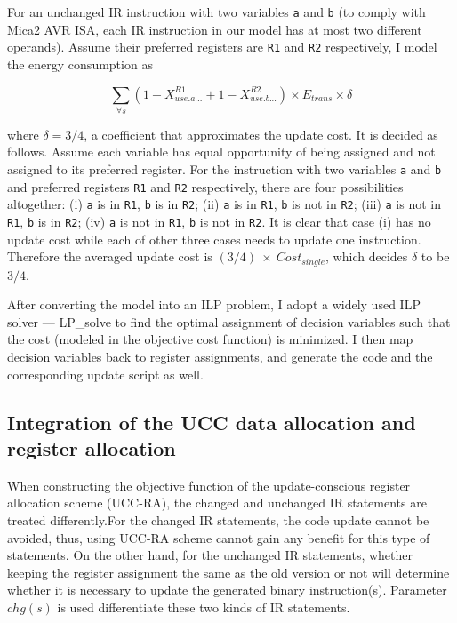 For an unchanged IR instruction with two variables {\tt a} and {\tt b}
(to comply with Mica2 AVR ISA, each IR instruction in our model has at
most two different operands). Assume their preferred registers are
{\tt R1} and {\tt R2} respectively, I model the energy consumption as

\begin{small}
\begin{equation}
\sum_{\forall s}(1-X_{use.a...}^{R1} + 
1-X_{use.b...}^{R2})  \times E_{trans} \times \delta 
\end{equation}
\end{small}
\noindent
where $\delta=3/4$, a coefficient that approximates the update cost.
It is decided as follows. Assume each variable has equal opportunity
of being assigned and not assigned to its preferred register. For the
instruction with two variables {\tt a} and {\tt b} and preferred
registers {\tt R1} and {\tt R2} respectively, there are four
possibilities altogether: (i) {\tt a} is in {\tt R1}, {\tt b} is in
{\tt R2}; (ii) {\tt a} is in {\tt R1}, {\tt b} is not in {\tt R2};
(iii) {\tt a} is not in {\tt R1}, {\tt b} is in {\tt R2}; (iv) {\tt a}
is not in {\tt R1}, {\tt b} is not in {\tt R2}. It is clear that case
(i) has no update cost while each of other three cases needs to update
one instruction. Therefore the averaged update cost is $
(3/4)~\times~Cost_{single}$, which decides $\delta$ to be $3/4$.

After converting the model into an ILP problem, I adopt a widely used
ILP solver --- LP\_solve \cite{lpsolve} to find the optimal assignment
of decision variables such that the cost (modeled in the objective
cost function) is minimized.  I then map decision variables back to
register assignments, and generate the code and the corresponding
update script as well.

\subsection{Integration of the UCC data allocation and register allocation}\label{integration}

When constructing the objective function of the update-conscious register allocation scheme (UCC-RA),
the changed and unchanged IR statements are treated differently.For the changed IR statements, the code update cannot be avoided, thus, using UCC-RA scheme cannot
gain any benefit for this type of statements. On the other hand, for the unchanged IR statements, 
whether keeping the register assignment the same as the old version or not will determine whether
it is necessary to update the generated binary instruction(s).  Parameter $chg(s)$ is used 
differentiate these two kinds of IR statements.

